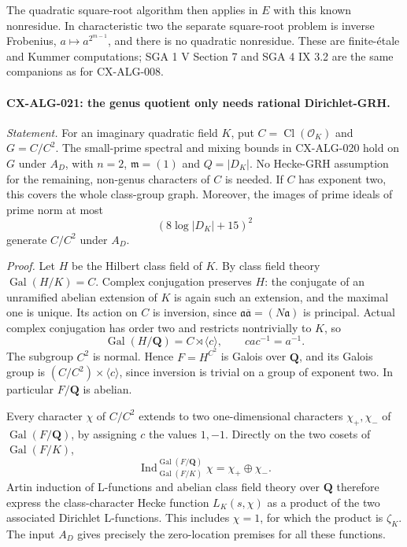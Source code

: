 \documentclass[11pt,a4paper]{article}
\begin{document}
The quadratic square-root algorithm then applies in $E$ with this known
nonresidue. In characteristic two the separate square-root problem is
inverse Frobenius, $a\mapsto a^{2^{m-1}}$, and there is no quadratic
nonresidue. These are finite-\'etale and Kummer computations; SGA 1 V
Section 7 and SGA 4 IX 3.2 are the same companions as for CX-ALG-008.

\paragraph{CX-ALG-021: the genus quotient only needs rational Dirichlet-GRH.}
\emph{Statement.} For an imaginary quadratic field $K$, put
$C=\operatorname{Cl}(\mathcal O_K)$ and $G=C/C^2$. The small-prime
spectral and mixing bounds in CX-ALG-020 hold on $G$ under $A_D$, with
$n=2$, $\mathfrak m=(1)$ and $Q=|D_K|$. No Hecke-GRH assumption for
the remaining, non-genus characters of $C$ is needed. If $C$ has exponent
two, this covers the whole class-group graph.
Moreover, the images of prime ideals of prime norm at most
\[
                         (8\log|D_K|+15)^2
\]
generate $C/C^2$ under $A_D$.

\emph{Proof.} Let $H$ be the Hilbert class field of $K$.
By class field theory $\operatorname{Gal}(H/K)=C$. Complex conjugation
preserves $H$: the conjugate of an unramified abelian extension of $K$
is again such an extension, and the maximal one is unique. Its action on
$C$ is inversion, since
$\mathfrak a\overline{\mathfrak a}=(N\mathfrak a)$ is principal.
Actual complex conjugation has order two and restricts nontrivially to
$K$, so
\[
       \operatorname{Gal}(H/\mathbf Q)=C\rtimes\langle c\rangle,
                    \qquad cac^{-1}=a^{-1}.
\]
The subgroup $C^2$ is normal. Hence $F=H^{C^2}$ is Galois over
$\mathbf Q$, and its Galois group is
$(C/C^2)\times\langle c\rangle$, since inversion is trivial on a group
of exponent two. In particular $F/\mathbf Q$ is abelian.

Every character $\chi$ of $C/C^2$ extends to two one-dimensional
characters $\chi_+,\chi_-$ of $\operatorname{Gal}(F/\mathbf Q)$, by
assigning $c$ the values $1,-1$. Directly on the two cosets of
$\operatorname{Gal}(F/K)$,
\[
       \operatorname{Ind}_{\operatorname{Gal}(F/K)}^{
                       \operatorname{Gal}(F/\mathbf Q)}\chi
                         =\chi_+\oplus\chi_-.
\]
Artin induction of L-functions and abelian class field theory over
$\mathbf Q$ therefore express the class-character Hecke function
$L_K(s,\chi)$ as a product of the two associated Dirichlet L-functions.
This includes $\chi=1$, for which the product is $\zeta_K$.
The input $A_D$ gives precisely the zero-location premises for all these
functions.
\end{document}
